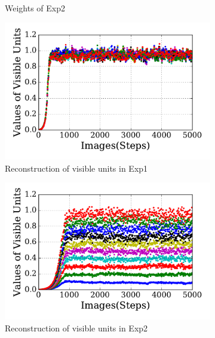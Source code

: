 \begin{figure}
\begin{subfigure}[t]{0.45\textwidth}
		\caption{Weights of Exp2}
	\end{subfigure}
	\begin{subfigure}[t]{0.45\textwidth}
		\includegraphics[width=\textwidth]{pics_sdlm/31_exp_RBM_noise/exp1_recon_s.pdf}
		\caption{Reconstruction of visible units in Exp1}
	\end{subfigure}
	\begin{subfigure}[t]{0.45\textwidth}
		\includegraphics[width=\textwidth]{pics_sdlm/31_exp_RBM_noise/exp2_recon_s.pdf}
		\caption{Reconstruction of visible units in Exp2}
	\end{subfigure}\\
	\begin{subfigure}[t]{0.45\textwidth}

\end{subfigure}
\end{figure}

